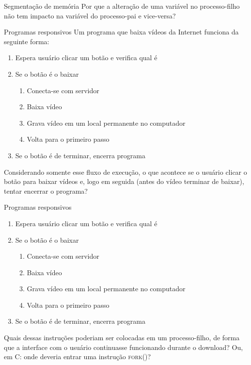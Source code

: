 \documentclass{beamer}
\begin{document}
\begin{frame}[fragile]{Segmentação de memória}
  \centering
  \Large
  Por que a alteração de uma variável no processo-filho não tem impacto na
  variável do processo-pai e vice-versa?
\end{frame}

\begin{frame}[fragile]{Programas responsivos}
  \centering
  \large
  Um programa que baixa vídeos da Internet funciona da seguinte forma:
  \begin{enumerate}
    \item Espera usuário clicar um botão e verifica qual é
    \item Se o botão é o baixar
      \begin{enumerate}
        \item Conecta-se com servidor
        \item Baixa vídeo
        \item Grava vídeo em um local permanente no computador
        \item Volta para o primeiro passo
      \end{enumerate}
     \item Se o botão é de terminar, encerra programa
  \end{enumerate}

  Considerando somente esse fluxo de execução, o que acontece se o usuário
  clicar o botão para baixar vídeos e, logo em seguida (antes do vídeo terminar
  de baixar), tentar encerrar o programa?
\end{frame}

\begin{frame}[fragile]{Programas responsivos}
  \centering
  \large
  \begin{enumerate}
    \item Espera usuário clicar um botão e verifica qual é
    \item Se o botão é o baixar
      \begin{enumerate}
        \item Conecta-se com servidor
        \item Baixa vídeo
        \item Grava vídeo em um local permanente no computador
        \item Volta para o primeiro passo
      \end{enumerate}
     \item Se o botão é de terminar, encerra programa
  \end{enumerate}

  Quais dessas instruções poderiam ser colocadas em um processo-filho, de forma
  que a interface com o usuário continuasse funcionando durante o download? Ou,
  em C: onde deveria entrar uma instrução \textsc{fork()}?
\end{frame}
\end{document}
